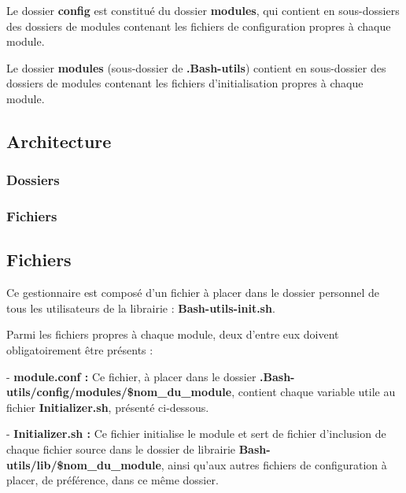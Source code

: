\documentclass[a4paper,10pt]{article}
\begin{document}
  Le dossier \textbf{\color{lime}config\color{white}} est constitué du dossier \textbf{\color{lime}modules\color{white}}, qui contient en sous-dossiers des dossiers de modules contenant les fichiers de configuration propres à chaque module.\linebreak

  Le dossier \textbf{\color{lime}modules\color{white}} (sous-dossier de \textbf{\color{lime}.Bash-utils\color{white}}) contient en sous-dossier des dossiers de modules contenant les fichiers d'initialisation propres à chaque module.

  \color{green}

  \subsection{Architecture}\color{white}

  \color{blue}
  \subsubsection{Dossiers}\color{white}
  
  \color{blue}
  \subsubsection{Fichiers}\color{white}

  \subsection{Fichiers}\color{white}
  Ce gestionnaire est composé d'un fichier à placer dans le dossier personnel de tous les utilisateurs de la librairie :  \textbf{\color{lime}Bash-utils-init.sh\color{white}}.\linebreak

  Parmi les fichiers propres à chaque module, deux d'entre eux doivent obligatoirement être présents :\linebreak

  - \textbf{\color{lime}module.conf\color{white} :} Ce fichier, à placer dans le dossier \textbf{\color{lime}.Bash-utils/config/modules/\$nom\_du\_module\color{white}}, contient chaque variable utile au fichier \textbf{\color{lime}Initializer.sh\color{white}}, présenté ci-dessous.\linebreak

  - \textbf{\color{lime}Initializer.sh\color{white} :} Ce fichier initialise le module et sert de fichier d'inclusion de chaque fichier source dans le dossier de librairie \textbf{\color{lime}Bash-utils/lib/\$nom\_du\_module\color{white}}, ainsi qu'aux autres fichiers de configuration à placer, de préférence, dans ce même dossier.\linebreak
\end{document}
